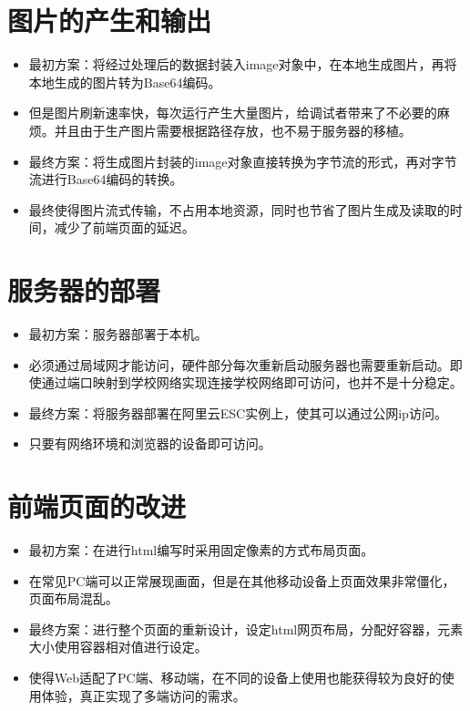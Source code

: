 \section{图片的产生和输出}
\begin{itemize}
    \item 最初方案：将经过处理后的数据封装入image对象中，在本地生成图片，再将本地生成的图片转为Base64编码。
    \item 但是图片刷新速率快，每次运行产生大量图片，给调试者带来了不必要的麻烦。并且由于生产图片需要根据路径存放，也不易于服务器的移植。
    \item 最终方案：将生成图片封装的image对象直接转换为字节流的形式，再对字节流进行Base64编码的转换。
    \item 最终使得图片流式传输，不占用本地资源，同时也节省了图片生成及读取的时间，减少了前端页面的延迟。
    \end{itemize}
\section{服务器的部署}
    \begin{itemize}
    \item 最初方案：服务器部署于本机。
    \item 必须通过局域网才能访问，硬件部分每次重新启动服务器也需要重新启动。即使通过端口映射到学校网络实现连接学校网络即可访问，也并不是十分稳定。
    \item 最终方案：将服务器部署在阿里云ESC实例上，使其可以通过公网ip访问。
    \item 只要有网络环境和浏览器的设备即可访问。
    \end{itemize}
\section{前端页面的改进}
\begin{itemize}
    \item 最初方案：在进行html编写时采用固定像素的方式布局页面。
    \item 在常见PC端可以正常展现画面，但是在其他移动设备上页面效果非常僵化，页面布局混乱。
    \item 最终方案：进行整个页面的重新设计，设定html网页布局，分配好容器，元素大小使用容器相对值进行设定。
    \item 使得Web适配了PC端、移动端，在不同的设备上使用也能获得较为良好的使用体验，真正实现了多端访问的需求。
    \end{itemize}

